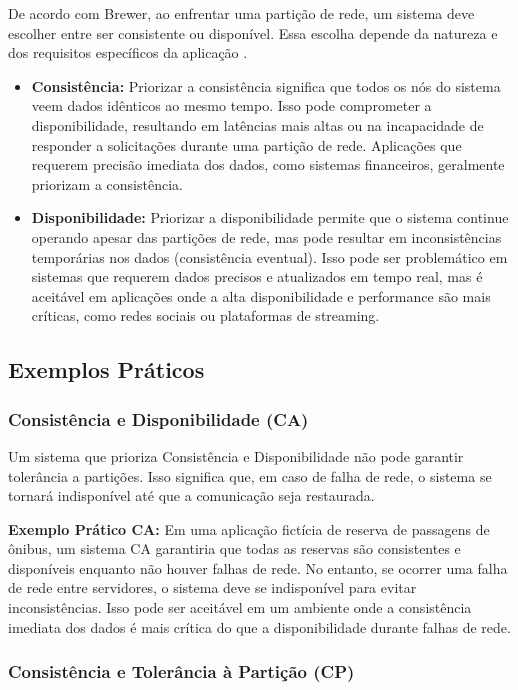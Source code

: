 De acordo com Brewer, ao enfrentar uma partição de rede, um sistema deve escolher entre ser consistente ou disponível. Essa escolha depende da natureza e dos requisitos específicos da aplicação \cite{brewer2000}.

\begin{itemize}
    \item \textbf{Consistência:} Priorizar a consistência significa que todos os nós do sistema veem dados idênticos ao mesmo tempo. Isso pode comprometer a disponibilidade, resultando em latências mais altas ou na incapacidade de responder a solicitações durante uma partição de rede. Aplicações que requerem precisão imediata dos dados, como sistemas financeiros, geralmente priorizam a consistência.
    \item \textbf{Disponibilidade:} Priorizar a disponibilidade permite que o sistema continue operando apesar das partições de rede, mas pode resultar em inconsistências temporárias nos dados (consistência eventual). Isso pode ser problemático em sistemas que requerem dados precisos e atualizados em tempo real, mas é aceitável em aplicações onde a alta disponibilidade e performance são mais críticas, como redes sociais ou plataformas de streaming.
\end{itemize}

\subsection{Exemplos Práticos}

\subsubsection{Consistência e Disponibilidade (CA)}

Um sistema que prioriza Consistência e Disponibilidade não pode garantir tolerância a partições. Isso significa que, em caso de falha de rede, o sistema se tornará indisponível até que a comunicação seja restaurada.

\textbf{Exemplo Prático CA:} Em uma aplicação fictícia de reserva de passagens de ônibus, um sistema CA garantiria que todas as reservas são consistentes e disponíveis enquanto não houver falhas de rede. No entanto, se ocorrer uma falha de rede entre servidores, o sistema deve se indisponível para evitar inconsistências. Isso pode ser aceitável em um ambiente onde a consistência imediata dos dados é mais crítica do que a disponibilidade durante falhas de rede.

\subsubsection{Consistência e Tolerância à Partição (CP)}

